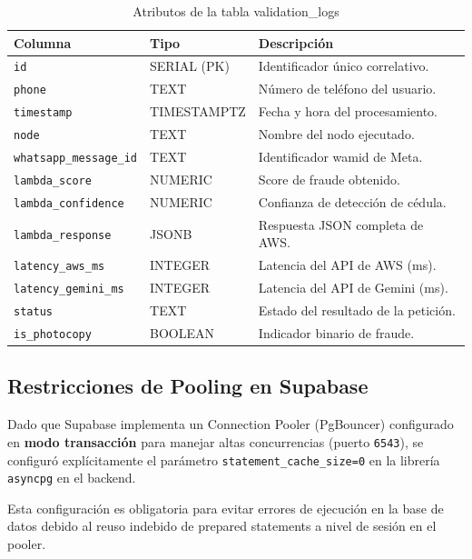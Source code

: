 \begin{table}[ht]
\centering
\caption{Atributos de la tabla validation\_logs}
\footnotesize
\renewcommand{\arraystretch}{1.4}
\begin{tabular}{p{2.2cm} p{1.8cm} p{2.8cm}}
\toprule
\textbf{Columna} & \textbf{Tipo} & \textbf{Descripción} \\
\midrule
\texttt{id} & SERIAL (PK) & Identificador único correlativo. \\
\texttt{phone} & TEXT & Número de teléfono del usuario. \\
\texttt{timestamp} & TIMESTAMP\-TZ & Fecha y hora del procesamiento. \\
\texttt{node} & TEXT & Nombre del nodo ejecutado. \\
\texttt{whatsapp\_\allowbreak message\_id} & TEXT & Identificador wamid de Meta. \\
\texttt{lambda\_\allowbreak score} & NUMERIC & Score de fraude obtenido. \\
\texttt{lambda\_\allowbreak confidence} & NUMERIC & Confianza de detección de cédula. \\
\texttt{lambda\_\allowbreak response} & JSONB & Respuesta JSON completa de AWS. \\
\texttt{latency\_\allowbreak aws\_ms} & INTEGER & Latencia del API de AWS (ms). \\
\texttt{latency\_\allowbreak gemini\_ms} & INTEGER & Latencia del API de Gemini (ms). \\
\texttt{status} & TEXT & Estado del resultado de la petición. \\
\texttt{is\_photocopy} & BOOLEAN & Indicador binario de fraude. \\
\bottomrule
\end{tabular}
\end{table}

\subsection{Restricciones de Pooling en Supabase}
Dado que Supabase implementa un Connection Pooler (PgBouncer) configurado en \textbf{modo transacción} para manejar altas concurrencias (puerto \texttt{6543}), se configuró explícitamente el parámetro \texttt{statement\_cache\_size=0} en la librería \texttt{asyncpg} en el backend. 

Esta configuración es obligatoria para evitar errores de ejecución en la base de datos debido al reuso indebido de prepared statements a nivel de sesión en el pooler.
